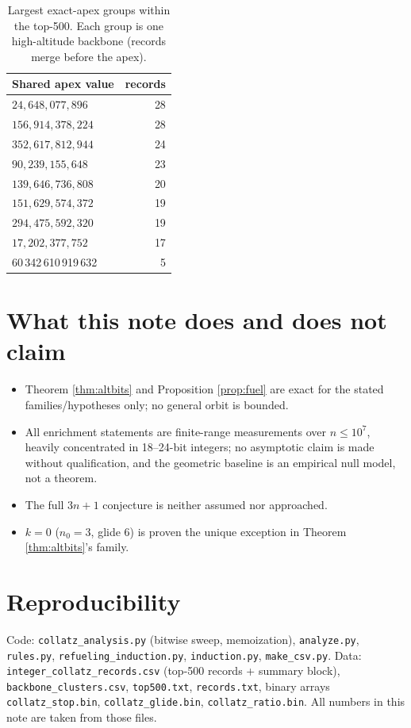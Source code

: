 \documentclass[11pt]{article}
\theoremstyle{remark}
\newcommand{\rankOneApex}{60\,342\,610\,919\,632}
\begin{document}
\begin{table}[t]
\centering
\begin{tabular}{@{}lr@{}}
\toprule
Shared apex value & records \\
\midrule
$24{,}648{,}077{,}896$ & 28 \\
$156{,}914{,}378{,}224$ & 28 \\
$352{,}617{,}812{,}944$ & 24 \\
$90{,}239{,}155{,}648$ & 23 \\
$139{,}646{,}736{,}808$ & 20 \\
$151{,}629{,}574{,}372$ & 19 \\
$294{,}475{,}592{,}320$ & 19 \\
$17{,}202{,}377{,}752$ & 17 \\
\rankOneApex & 5 \\
\bottomrule
\end{tabular}
\caption{Largest exact-apex groups within the top-500. Each group is one
high-altitude backbone (records merge before the apex).}
\label{tab:apex}
\end{table}

\section{What this note does and does not claim}
\label{sec:scope}
\begin{itemize}
  \item Theorem \ref{thm:altbits} and Proposition \ref{prop:fuel} are
        exact for the stated families/hypotheses only; no general orbit is
        bounded.
  \item All enrichment statements are finite-range measurements over
        $n \le 10^7$, heavily concentrated in 18--24-bit integers; no
        asymptotic claim is made without qualification, and the geometric
        baseline is an empirical null model, not a theorem.
  \item The full $3n+1$ conjecture is neither assumed nor approached.
  \item $k = 0$ ($n_0 = 3$, glide $6$) is proven the unique exception in
        Theorem \ref{thm:altbits}'s family.
\end{itemize}

\section*{Reproducibility}
Code: \texttt{collatz\_analysis.py} (bitwise sweep, memoization),
\texttt{analyze.py}, \texttt{rules.py}, \texttt{refueling\_induction.py},
\texttt{induction.py}, \texttt{make\_csv.py}. Data:
\texttt{integer\_collatz\_records.csv} (top-500 records + summary block),
\texttt{backbone\_clusters.csv}, \texttt{top500.txt}, \texttt{records.txt},
binary arrays \texttt{collatz\_stop.bin}, \texttt{collatz\_glide.bin},
\texttt{collatz\_ratio.bin}. All numbers in this note are taken from those
files.
\end{document}
